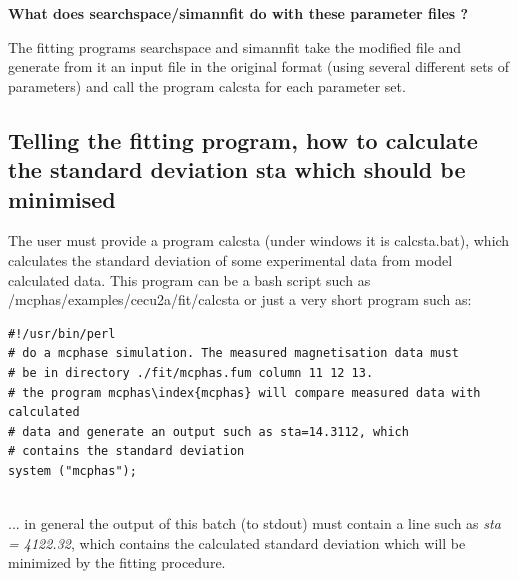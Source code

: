 {\bf What does searchspace/simannfit do with these parameter files ?}

The fitting programs {\prg searchspace} and 
{\prg simannfit} take the modified file and generate from it an
input file in the original format (using several different
sets of parameters) and call the program
{\prg calcsta} for each parameter set.

\subsection{Telling the fitting program, how to calculate the standard deviation {\prg sta} which should be minimised}


The user must provide a program {\prg calcsta}  (under windows 
it is {\prg calcsta.bat}), which calculates the standard deviation
of some experimental data from model calculated data. This program can
be a bash script such as {\prg /mcphas/examples/cecu2a/fit/calcsta} or just a
very short program such as:


\begin{verbatim}
#!/usr/bin/perl
# do a mcphase simulation. The measured magnetisation data must
# be in directory ./fit/mcphas.fum column 11 12 13.
# the program mcphas\index{mcphas} will compare measured data with calculated
# data and generate an output such as sta=14.3112, which
# contains the standard deviation
system ("mcphas");


\end{verbatim}

... in general the output of this batch (to stdout) must contain a line
such as {\em sta = 4122.32}, which contains the calculated standard
deviation which will be minimized by the fitting procedure.

